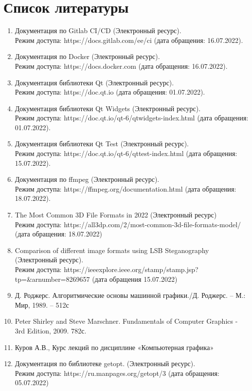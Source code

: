 \documentclass[a4paper,14pt]{extreport}
\begin{document}
		\chapter*{Список литературы}
		\begin{enumerate} 
        			\item Документация по Gitlab CI/CD (Электронный ресурс). \\Режим 
доступа: https://docs.gitlab.com/ee/ci (дата обращения: 16.07.2022).
			\item Документация по Docker (Электронный ресурс).\\Режим доступа: 
https://docs.docker.com (дата обращения: 16.07.2022).
			\item Документация библиотеки Qt (Электронный ресурс).\\ Режим доступа: 
https://doc.qt.io (дата обращения: 01.07.2022). 
			\item Документация библиотеки Qt Widgets (Электронный ресурс). \\Режим 
доступа: https://doc.qt.io/qt-6/qtwidgets-index.html (дата обращения: 
01.07.2022).
			\item Документация библиотеки Qt Test (Электронный ресурс). \\Режим 
доступа: https://doc.qt.io/qt-6/qttest-index.html (дата обращения: 
15.07.2022).
			\item Документация по ffmpeg (Электронный ресурс). \\Режим доступа: 
https://ffmpeg.org/documentation.html (дата обращения: 18.07.2022).
			\item The Most Common 3D File Formats in 2022 (Электронный ресурс) \\ Режим доступа: https://all3dp.com/2/most-common-3d-file-formats-model/ (дата обращения: 18.07.2022)
			\item Comparison of different image formats using LSB Steganography 
(Электронный ресурс). \\Режим доступа: 
https://ieeexplore.ieee.org/stamp/stamp.jsp?tp=\&arnumber=8269657 
(дата обращения 15.07.2022)
			\item Д. Роджерс. Алгоритмические основы машинной графики./Д.
Роджерс. – М.: Мир, 1989. – 512с
			\item Peter Shirley and Steve Marschner. Fundamentals of Computer
Graphics - 3rd Edition, 2009. 782с.
			\item Куров А.В., Курс лекций по дисциплине «Компьютерная графика»
			\item Документация по библиотеке getopt. (Электронный ресурс). \\Режим 
доступа: https://ru.manpages.org/getopt/3 (дата обращения: 
05.07.2022)

    		\end{enumerate} 
\end{document}
